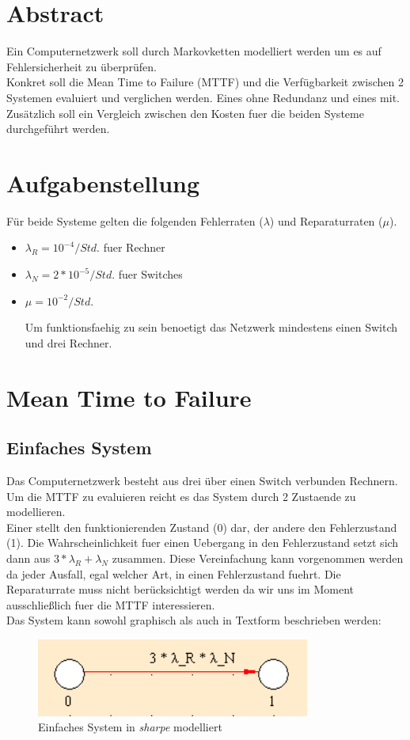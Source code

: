 \documentclass[10pt,a4paper]{article}
\begin{document}


\newpage
\section{Abstract}
Ein Computernetzwerk soll durch Markovketten modelliert werden um es auf Fehlersicherheit zu überprüfen.
\\ 
Konkret soll die Mean Time to Failure (MTTF) und die Verfügbarkeit zwischen 2 Systemen evaluiert und verglichen werden. Eines ohne Redundanz und eines mit.
Zusätzlich soll ein Vergleich zwischen den Kosten fuer die beiden Systeme durchgeführt werden.
\section{Aufgabenstellung}
Für beide Systeme gelten die folgenden Fehlerraten ($\lambda$) und Reparaturraten ($\mu$).
\begin{itemize}
	\item $\lambda_R=10^{-4}/Std.$ fuer Rechner
	\item $\lambda_N=2*10^{-5}/Std.$ fuer Switches
	\item  $\mu=10^{-2}/Std. $
	
Um funktionsfaehig zu sein benoetigt das Netzwerk mindestens einen Switch und drei Rechner.
\end{itemize}
\section{Mean Time to Failure}
\subsection{Einfaches System}
Das Computernetzwerk besteht aus drei über einen Switch verbunden Rechnern.
\\
Um die MTTF zu evaluieren reicht es das System durch 2 Zustaende zu modellieren. \\
Einer stellt den funktionierenden Zustand (0) dar, der andere den Fehlerzustand (1).
Die Wahrscheinlichkeit fuer einen Uebergang in den Fehlerzustand setzt sich dann aus $3*\lambda_R + \lambda_N$ zusammen. Diese Vereinfachung kann vorgenommen werden da jeder Ausfall, egal welcher Art, in einen Fehlerzustand fuehrt. 
Die Reparaturrate muss nicht berücksichtigt werden da wir uns im Moment ausschließlich fuer die MTTF interessieren.
\\
Das System kann sowohl graphisch als auch in Textform beschrieben werden:
\begin{figure}[ht!]
\centering
\includegraphics[width=90mm]{MTTM_EinfachesModell.png}
\caption{Einfaches System in \textit{sharpe} modelliert \label{mmtm_einfach}}
\end{figure}
\end{document}
